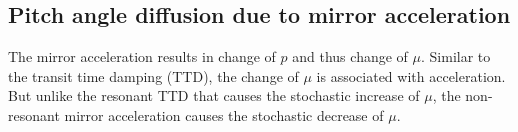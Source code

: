 \documentclass[preprint2,twocolumn,times,tighten]{aastex63}
\newcommand*{\xu}{\color{magenta}}
\begin{document}
{%






\subsection{Pitch angle diffusion due to mirror acceleration}

The mirror acceleration results in {change of $p$ and thus change of $\mu$.} 
Similar to the transit time damping (TTD), the change of $\mu$ is associated with acceleration.
But unlike the resonant TTD that causes the stochastic increase of $\mu$, 
the non-resonant mirror acceleration causes the stochastic decrease of $\mu$.





}
\end{document}
